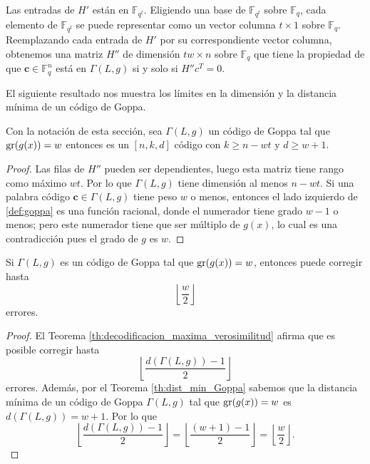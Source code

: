 Las entradas de $H'$ están en $\mathbb{F}_{q^t}$. Eligiendo una base de $\mathbb{F}_{q^t}$ sobre $\mathbb{F}_q$, cada elemento de $\mathbb{F}_{q^t}$ se puede representar como un vector columna $t \times 1$ sobre $\mathbb{F}_q$. Reemplazando cada entrada de $H'$ por su correspondiente vector columna, obtenemos una matriz $H''$ de dimensión $tw \times n$ sobre $\mathbb{F}_{q}$ que tiene la propiedad de que $\textbf{c} \in \mathbb{F}_q^n$ está en $\Gamma(L,g)$ si y solo si $H''c^T = 0$.

El siguiente resultado nos muestra los límites en la dimensión y la distancia mínima de un código de Goppa.

\begin{theorem}
    \label{th:dist_min_Goppa}
    Con la notación de esta sección, sea $\Gamma(L,g)$ un código de Goppa tal que $\operatorname{gr}(g(x)) = w$ entonces es un $[n, k, d]$ código con $k \geq n - wt$ y $d \geq w + 1$.
\end{theorem}

\begin{proof}
    Las filas de $H''$ pueden ser dependientes, luego esta matriz tiene rango como máximo $wt$. Por lo que $\Gamma(L,g)$ tiene dimensión al menos $n - wt$. Si una palabra código $\textbf{c} \in \Gamma(L,g)$ tiene peso $w$ o menos, entonces el lado izquierdo de \ref{def:goppa} es una función racional, donde el numerador tiene grado $w - 1$ o menos; pero este numerador tiene que ser múltiplo de $g(x)$, lo cual es una contradicción pues el grado de $g$ es $w$.
\end{proof}

\begin{corollary}
    Si $\Gamma(L,g)$ es un código de Goppa tal que $\operatorname{gr}(g(x)) = w$, entonces puede corregir hasta
    \[
        \left\lfloor \frac{w}{2} \right\rfloor
    \]
    errores.
\end{corollary}

\begin{proof}
    El Teorema \ref{th:decodificacion_maxima_verosimilitud} afirma que es posible corregir hasta 
    \[
        \left\lfloor \frac{d(\Gamma(L,g)) - 1}{2} \right\rfloor
    \]
    errores. Además, por el Teorema \ref{th:dist_min_Goppa} sabemos que la distancia mínima de un código de Goppa $\Gamma(L,g)$ tal que $\operatorname{gr}(g(x)) = w$ es $d(\Gamma(L,g)) = w + 1$. Por lo que
    \[
        \left\lfloor \frac{d(\Gamma(L,g)) - 1}{2} \right\rfloor = \left\lfloor \frac{(w + 1) - 1}{2} \right\rfloor = \left\lfloor \frac{w}{2} \right\rfloor .
    \]
\end{proof}


